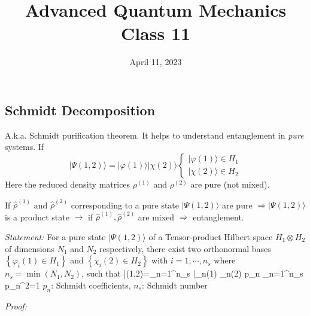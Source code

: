 \documentclass[12pt]{article}
\title{Advanced Quantum Mechanics\\Class 11}
\date{April 11, 2023}                                           %
\begin{document}
\maketitle

\subsection{Schmidt Decomposition}

A.k.a. Schmidt purification theorem.
It helps to understand entanglement in \emph{pure} systems.
If
\[
|\Psi(1,2)\rangle=|\varphi(1)\rangle|\chi(2)\rangle\left\{\begin{array}{l}|\varphi(1)\rangle \in H_{1} \\ |\chi(2)\rangle \in H_{2}\end{array}\right.
\]
Here the reduced density matrices \(\rho^{(1)}\) and \(\rho^{(2)}\)
are pure (not mixed).

If \(\hat{\rho}^{(1)}\) and \(\hat{\rho}^{(2)}\) corresponding to a pure state
\(|\Psi(1,2)\rangle\) are pure \(\Rightarrow|\Psi(1,2)\rangle\) is a product state
\(\rightarrow\) if \(\hat{\rho}^{(1)}, \hat{\rho}^{(2)}\) are mixed \(\Rightarrow\) entanglement.

\emph{Statement:} For a pure state \(|\Psi(1,2)\rangle\) of a
Tensor-product Hilbert space \(H_{1}\otimes H_{2}\)
of dimensions \(N_{1}\) and \(N_{2}\) respectively,
there exist two orthonormal bases
\(\left\{\varphi_{i}(1) \in H_{1}\right\}\) and 
\(\left\{\chi_{i}(2) \in H_{2}\right\}\) with \(i=1, \cdots, n_{s}\)
where \(n_{s}=\min\left(N_{1}, N_{2}\right)\), such that
\be
|\Psi(1,2)\rangle=\sum_{n=1}^{n_{s}} \left|\varphi_{n}(1) \otimes \chi_{n}(2)\right\rangle
\label{eq:g128}
\ee
{} \leqslant p_{n}  \sum_{n=1}^{n_{s}} p_{n}^{2}=1
\label{eq:g129}
\ee
$p_{n}$: Schmidt coefficients, \(n_{s}\): Schmidt number


\emph{Proof:}
\end{document}
